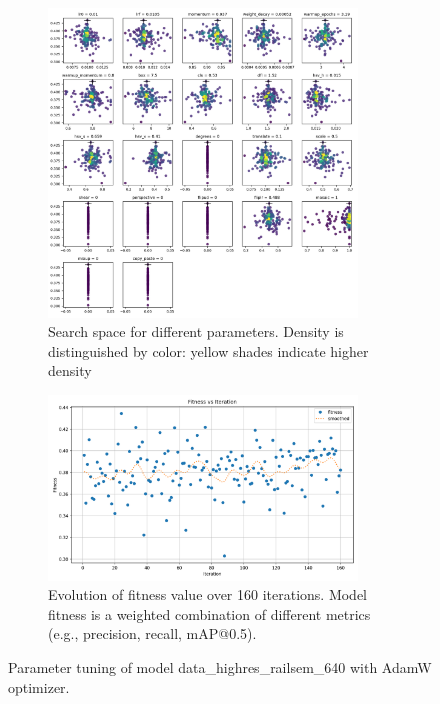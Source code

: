 \documentclass[Master,MDS,english]{BASE/twbook} %
\begin{document}
\begin{figure}
\centering
\begin{subfigure}[t]{.5\textwidth}
  \centering
  \includegraphics[width=0.9\textwidth]{images/yolo/highres/adam/tune_scatter_plots}
  \caption{Search space for different parameters. Density is distinguished by color: yellow shades indicate higher density}
\end{subfigure}%
\begin{subfigure}[t]{.5\textwidth}
  \centering
  \includegraphics[width=0.9\textwidth]{images/yolo/highres/adam/tune_fitness}
  \caption{Evolution of fitness value over 160 iterations. Model fitness is a weighted combination of different metrics (e.g., precision, recall, mAP@0.5).}
  \label{fig:images_from_videos}
\end{subfigure}
\caption{Parameter tuning of model data\_highres\_railsem\_640 with AdamW optimizer.}
\label{fig:yolo_tune_highres_adam}
\end{figure}
\end{document}
